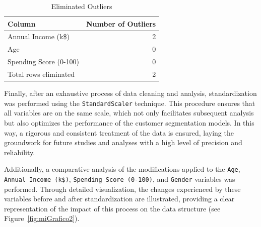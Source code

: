 \documentclass[10pt]{article}
\begin{document}
\begin{table}[h]
    \centering
    \caption{Eliminated Outliers}
    \label{tab:outliers_eliminate}
    \begin{tabular}{lr}
    \hline
    \textbf{Column} & \textbf{Number of Outliers} \\
    \hline
    Annual Income (k\$)        & 2 \\
    Age                       & 0 \\
    Spending Score (0-100)    & 0 \\
    Total rows eliminated & 2 \\
    \hline
    \end{tabular}
\end{table}

Finally, after an exhaustive process of data cleaning and analysis, standardization was performed using the \texttt{StandardScaler} technique. This procedure ensures that all variables are on the same scale, which not only facilitates subsequent analysis but also optimizes the performance of the customer segmentation models. In this way, a rigorous and consistent treatment of the data is ensured, laying the groundwork for future studies and analyses with a high level of precision and reliability.

Additionally, a comparative analysis of the modifications applied to the \texttt{Age}, \texttt{Annual Income (k\$)}, \texttt{Spending Score (0-100)}, and \texttt{Gender} variables was performed. Through detailed visualization, the changes experienced by these variables before and after standardization are illustrated, providing a clear representation of the impact of this process on the data structure (see Figure~\ref{fig:miGrafico2}).
\end{document}
